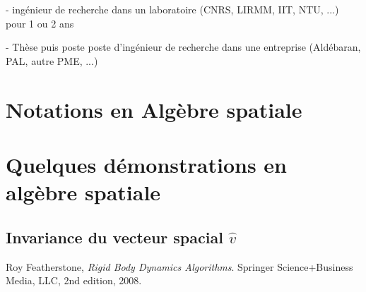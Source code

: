 \documentclass{report}
\begin{document}
- ingénieur de recherche dans un laboratoire (CNRS, LIRMM, IIT, NTU, ...) pour 1 ou 2 ans

- Thèse puis poste poste d'ingénieur de recherche dans une entreprise (Aldébaran, PAL, autre PME, ...)



\appendix

\chapter{Notations en Algèbre spatiale} \label{appx_notations}

\chapter{Quelques démonstrations en algèbre spatiale} \label{appx_dem}

\section{Invariance du vecteur spacial $\widehat{v}$}



\clearpage
{}
\begin{thebibliography}{9}

  Roy Featherstone,
  \emph{Rigid Body Dynamics Algorithms}.
  Springer Science+Business Media, LLC,
  2nd edition,
  2008.

\end{thebibliography}
\end{document}

